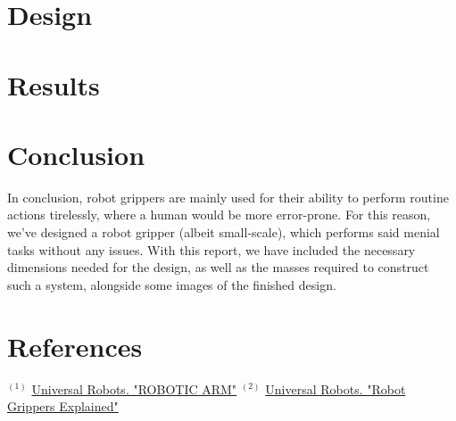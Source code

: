 \documentclass{article}
\begin{document}
\newpage
\section*{Design}

\newpage
\section*{Results}

\newpage
\section*{Conclusion}
In conclusion, robot grippers are mainly used for their ability to perform routine actions tirelessly,
where a human would be more error-prone. For this reason, we've designed a robot gripper (albeit small-scale), 
which performs said menial tasks without any issues. With this report, we have included the necessary dimensions 
needed for the design, as well as the masses required to construct such a system, alongside some images
of the finished design.

\newpage
\section*{References}
$^{(1)}$ \href{https://www.universal-robots.com/in/blog/robotic-arm/}{Universal Robots. "ROBOTIC ARM"}
$^{(2)}$ \href{https://www.universal-robots.com/blog/robot-grippers-explained/}{Universal Robots. "Robot Grippers Explained"}
\end{document}

